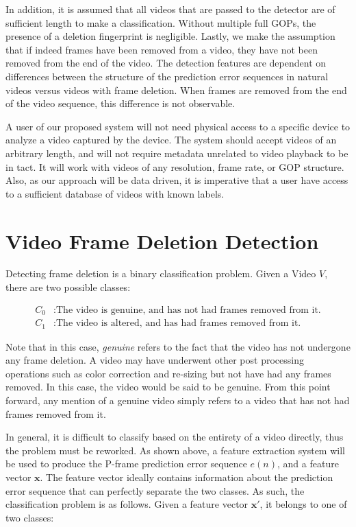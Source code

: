 In addition, it is assumed that all videos that are passed to the detector are of sufficient length to make a classification. Without multiple full GOPs, the presence of a deletion fingerprint is negligible. Lastly, we make the assumption that if indeed frames have been removed from a video, they have not been removed from the end of the video. The detection features are dependent on differences between the structure of the prediction error sequences in natural videos versus videos with frame deletion. When frames are removed from the end of the video sequence, this difference is not observable.

A user of our proposed system will not need physical access to a specific device to analyze a video captured by the device. The system should accept videos of an arbitrary length, and will not require metadata unrelated to video playback to be in tact. It will work with videos of any resolution, frame rate, or GOP structure. Also, as our approach will be data driven, it is imperative that a user have access to a sufficient database of videos with known labels.

\section{Video Frame Deletion Detection}

Detecting frame deletion is a binary classification problem. Given a Video $V$, there are two possible classes:

\begin{equation}
\begin{aligned}
  C_{0} &: \text{The video is genuine, and has not had frames removed from it.} \\
  C_{1} &: \text{The video is altered, and has had frames removed from it.}
\end{aligned}
\end{equation}

Note that in this case, \emph{genuine} refers to the fact that the video has not undergone any frame deletion. A video may have underwent other post processing operations such as color correction and re-sizing but not have had any frames removed. In this case, the video would be said to be genuine. From this point forward, any mention of a genuine video simply refers to a video that has not had frames removed from it.

In general, it is difficult to classify based on the entirety of a video directly, thus the problem must be reworked. As shown above, a feature extraction system will be used to produce the P-frame prediction error sequence $e(n)$, and a feature vector $\bm{x}$. The feature vector ideally contains information about the prediction error sequence that can perfectly separate the two classes. As such, the classification problem is as follows. Given a feature vector $\bm{x}'$, it belongs to one of two classes:

